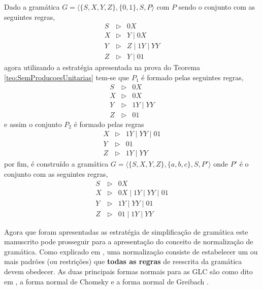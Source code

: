 \begin{example}
    Dado a gramática $G = \langle \{S, X, Y, Z\}, \{0, 1\}, S, P \rangle$ com $P$ sendo o conjunto com as seguintes regras,
    \begin{eqnarray*}
        S & \rhd & 0X \\
        X & \rhd & Y \mid 0X \\
        Y & \rhd & Z \mid 1Y \mid YY\\
        Z & \rhd & Y \mid 01
    \end{eqnarray*}
    agora utilizando a estratégia apresentada na prova do Teorema \ref{teo:SemProducoesUnitarias} tem-se que $P_1$ é formado pelas seguintes regras, 
    \begin{eqnarray*}
        S & \rhd & 0X \\
        X & \rhd & 0X \\
        Y & \rhd & 1Y \mid YY\\
        Z & \rhd & 01
    \end{eqnarray*}
    e assim o conjunto $P_2$ é formado pelas regras
    \begin{eqnarray*}
        X & \rhd & 1Y \mid YY \mid 01 \\
        Y & \rhd & 01 \\
        Z & \rhd & 1Y \mid YY
    \end{eqnarray*}
    por fim, é construído a gramática  $G = \langle \{S, X, Y, Z\}, \{a, b, c\}, S, P' \rangle$ onde $P'$ é o conjunto com as seguintes regras,
    \begin{eqnarray*}
        S & \rhd & 0X \\
        X & \rhd & 0X \mid 1Y \mid YY \mid 01 \\
        Y & \rhd & 1Y \mid YY \mid 01\\
        Z & \rhd & 01 \mid 1Y \mid YY
    \end{eqnarray*}
\end{example}

Agora que foram apresentadas as estratégia de simplificação de gramática este manuscrito pode prosseguir para a apresentação do conceito de normalização de gramática. Como explicado em \cite{menezes1998LFA}, uma normalização consiste de estabelecer um ou mais  padrões (ou restrições) que \textbf{todas as regras} de reescrita da gramática devem obedecer. As duas principais formas normais para as GLC são como dito em  \cite{benjaLivro2010}, a forma normal de Chomsky \cite{chomsky1959} e a forma normal de Greibach \cite{greibach1965}.


